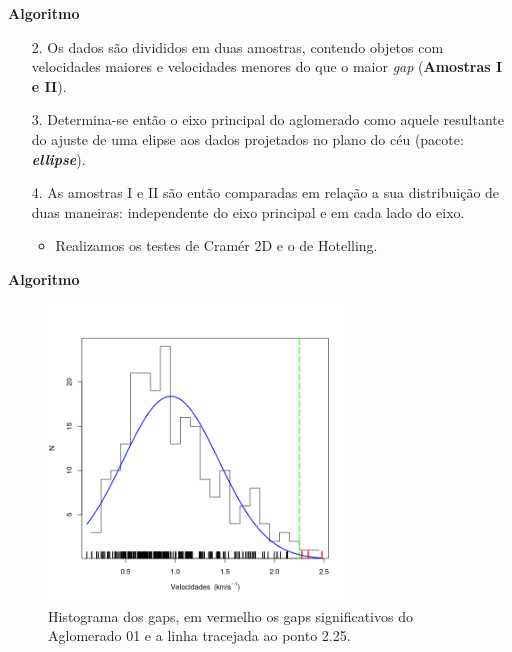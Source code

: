 \documentclass[xcolor=dvipsnames,10pt]{beamer}
\begin{document}
\begin{frame}{\textbf{Algoritmo}}
  \begin{enumerate}
    \item[2.] Os dados são divididos em duas amostras, contendo objetos com velocidades maiores e velocidades menores do que o maior \textit{gap} (\textbf{Amostras I e II}).
    \item[3.] Determina-se então o eixo principal do aglomerado como aquele resultante do ajuste de uma elipse aos dados projetados no plano do céu (pacote: \textbf{\textit{ellipse}}).
    \item[4.] As amostras I e II são então comparadas em relação a sua distribuição de duas maneiras: independente do eixo principal e em cada lado do eixo.
    \begin{itemize}
      \item Realizamos os testes de Cramér 2D e o de Hotelling.
    \end{itemize}
  \end{enumerate}
\end{frame}

\begin{frame}{\textbf{Algoritmo}}
  \begin{figure}
     \centering
    \includegraphics[height=0.7\textheight,width=0.7\textwidth]{resultados/gaps.png}
    \caption{Histograma dos gaps, em vermelho os gaps significativos do Aglomerado 01 e a linha tracejada ao ponto 2.25.}
  \end{figure}
\end{frame}
\end{document}
